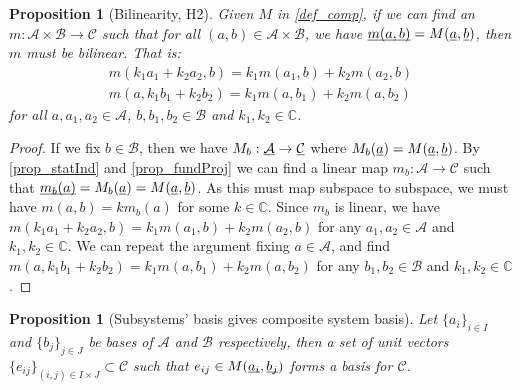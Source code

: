 \documentclass[aps,prl,amsmath,amssymb,twocolumn,nofootinbib]{revtex4}
\theoremstyle{plain}
\newtheorem{prop}[thrm]{Proposition}
\theoremstyle{definition}
\theoremstyle{remark}
\newcommand{\pj}[1] {\underbar{$#1$}}
\begin{document}
	\begin{prop}[Bilinearity, H2]\label{prop_bilinearity}
		Given $M$ in \ref{def_comp}, if we can find an $m : \mathcal{A} \times \mathcal{B} \to \mathcal{C}$ such that for all $(a,b) \in \mathcal{A} \times \mathcal{B}$, we have $\pj{m(a,b)} = M(\pj{a}, \pj{b})$, then $m$ must be bilinear. That is:
		\begin{align}
		m(k_1a_1 + k_2a_2, b)=k_1m(a_1, b) + k_2m(a_2, b) \\
		m(a, k_1b_1 + k_2b_2)=k_1m(a, b_1) + k_2m(a, b_2)
		\end{align}
		for all $a, a_1, a_2 \in \mathcal{A}$, $b, b_1, b_2 \in \mathcal{B}$ and $k_1, k_2 \in \mathbb{C}$.
	\end{prop}
	
	\begin{proof}
		If we fix $b \in \mathcal{B}$, then we have $M_b : \pj{\mathcal{A}} \to \pj{\mathcal{C}}$ where $M_b(\pj{a}) = M(\pj{a}, \pj{b})$. By \ref{prop_statInd} and \ref{prop_fundProj} we can find a linear map $m_b : \mathcal{A} \to \mathcal{C}$ such that $\pj{m_b(a)} = M_b(\pj{a}) = M(\pj{a}, \pj{b})$. As this must map subspace to subspace, we must have $m(a, b) = k m_b(a)$ for some $k \in \mathbb{C}$. Since $m_b$ is linear, we have $m(k_1a_1 + k_2a_2, b)=k_1m(a_1, b) + k_2m(a_2, b)$ for any $a_1, a_2 \in \mathcal{A}$ and $k_1, k_2 \in \mathbb{C}$. We can repeat the argument fixing $a \in \mathcal{A}$, and find $m(a, k_1b_1 + k_2b_2)=k_1m(a, b_1) + k_2m(a, b_2)$ for any $b_1, b_2 \in \mathcal{B}$ and $k_1, k_2 \in \mathbb{C}$.
	\end{proof}
	
	\begin{prop}[Subsystems' basis gives composite system
		basis]\label{prop_basis}
		Let $\{a_i\}_{i\in I}$ and $\{b_j\}_{j \in J}$ be bases of $\mathcal{A}$ and $\mathcal{B}$ respectively, then a set of unit vectors $\{e_{ij}\}_{(i,j) \in I \times J} \subset \mathcal{C}$  such that $e_{ij} \in M(\underbar{$a_i$}, \underbar{$b_j$})$ forms a basis for $\mathcal{C}$.
	\end{prop}
	
\end{document}
